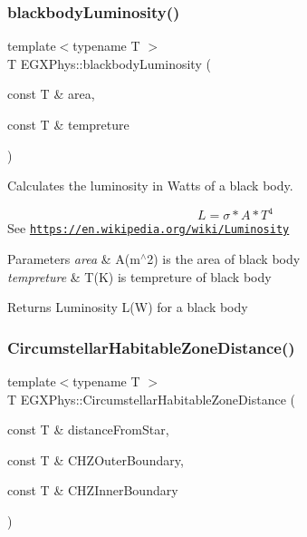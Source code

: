 \subsubsection{\texorpdfstring{blackbody\+Luminosity()}{blackbodyLuminosity()}}
{\footnotesize\ttfamily template$<$typename T $>$ \\
T E\+G\+X\+Phys\+::blackbody\+Luminosity (\begin{DoxyParamCaption}\item[{const T \&}]{area,  }\item[{const T \&}]{tempreture }\end{DoxyParamCaption})}



Calculates the luminosity in Watts of a black body. 

\[L=\sigma*A*T^4\] See \href{https://en.wikipedia.org/wiki/Luminosity}{\tt https\+://en.\+wikipedia.\+org/wiki/\+Luminosity}


\begin{DoxyParams}{Parameters}
{\em area} & A(m$^\wedge$2) is the area of black body \\
\hline
{\em tempreture} & T(\+K) is tempreture of black body \\
\hline
\end{DoxyParams}
\begin{DoxyReturn}{Returns}
Luminosity L(\+W) for a black body 
\end{DoxyReturn}
\mbox{\label{group___astrophysics_gacf3a720793cdb27f6d93b170b44e81be}} 
\subsubsection{\texorpdfstring{Circumstellar\+Habitable\+Zone\+Distance()}{CircumstellarHabitableZoneDistance()}}
{\footnotesize\ttfamily template$<$typename T $>$ \\
T E\+G\+X\+Phys\+::\+Circumstellar\+Habitable\+Zone\+Distance (\begin{DoxyParamCaption}\item[{const T \&}]{distance\+From\+Star,  }\item[{const T \&}]{C\+H\+Z\+Outer\+Boundary,  }\item[{const T \&}]{C\+H\+Z\+Inner\+Boundary }\end{DoxyParamCaption})}



